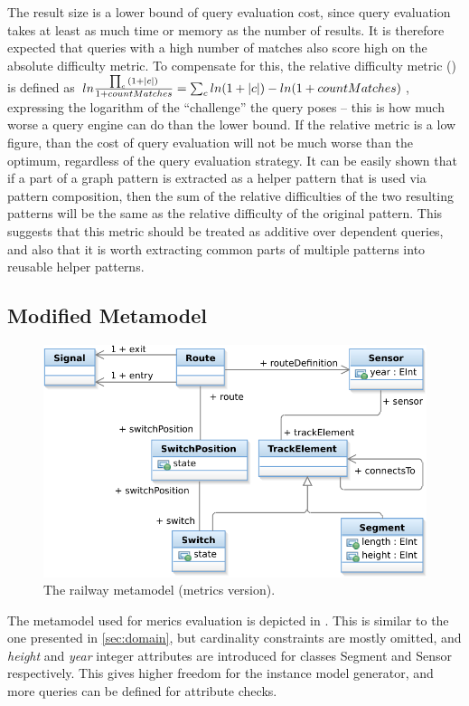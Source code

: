 The result size is a lower bound of query evaluation cost, since query
evaluation takes at least as much time or memory as the number of results. It is
therefore expected that queries with a high number of matches also score high on
the absolute difficulty metric. To compensate for this, the relative difficulty
metric () is defined as
$ln\frac{\prod_{c}{(1+|{c}|)}}{1+countMatches} = \sum_{c}{ln(1+|{c}|)} -
ln(1+countMatches)$, expressing the logarithm of the ``challenge'' the query
poses -- this is how much worse a query engine can do than the lower bound. 
If the relative metric is a low figure, than the cost of query evaluation will not
be much worse than the optimum, regardless of the query evaluation strategy. It
can be easily shown that if a part of a graph pattern is extracted as a helper
pattern that is used via pattern composition, then the sum of the relative
difficulties of the two resulting patterns will be the same as the relative
difficulty of the original pattern. This suggests that this metric should be
treated as additive over dependent queries, and also that it is worth extracting
common parts of multiple patterns into reusable helper patterns.

\subsection{Modified Metamodel}

\begin{figure}[Hhtb]
\begin{center}
\includegraphics[width=12cm]{figures/TrainMMMet.pdf}
\caption{The railway metamodel (metrics version).}
\label{fig:metamodel-met}
\end{center}
\end{figure}

The metamodel used for merics evaluation is depicted in . This is similar to the one presented in \autoref{sec:domain}, but cardinality constraints are mostly omitted, and \emph{height} and \emph{year} integer attributes are introduced for classes Segment and Sensor respectively. This gives higher freedom for the instance model generator, and more queries can be defined for attribute checks.

